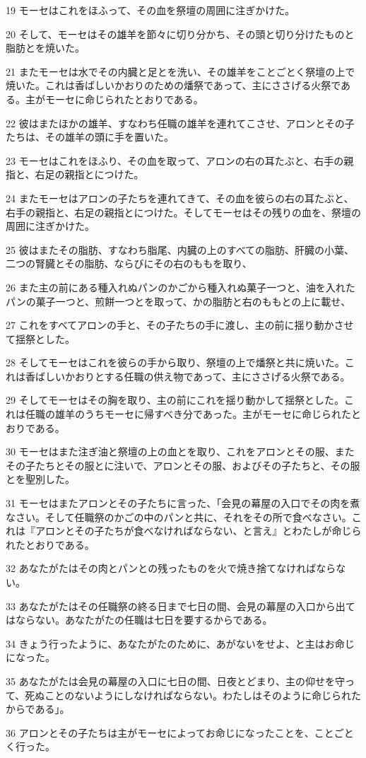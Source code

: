 \par 19 モーセはこれをほふって、その血を祭壇の周囲に注ぎかけた。
\par 20 そして、モーセはその雄羊を節々に切り分かち、その頭と切り分けたものと脂肪とを焼いた。
\par 21 またモーセは水でその内臓と足とを洗い、その雄羊をことごとく祭壇の上で焼いた。これは香ばしいかおりのための燔祭であって、主にささげる火祭である。主がモーセに命じられたとおりである。
\par 22 彼はまたほかの雄羊、すなわち任職の雄羊を連れてこさせ、アロンとその子たちは、その雄羊の頭に手を置いた。
\par 23 モーセはこれをほふり、その血を取って、アロンの右の耳たぶと、右手の親指と、右足の親指とにつけた。
\par 24 またモーセはアロンの子たちを連れてきて、その血を彼らの右の耳たぶと、右手の親指と、右足の親指とにつけた。そしてモーセはその残りの血を、祭壇の周囲に注ぎかけた。
\par 25 彼はまたその脂肪、すなわち脂尾、内臓の上のすべての脂肪、肝臓の小葉、二つの腎臓とその脂肪、ならびにその右のももを取り、
\par 26 また主の前にある種入れぬパンのかごから種入れぬ菓子一つと、油を入れたパンの菓子一つと、煎餅一つとを取って、かの脂肪と右のももとの上に載せ、
\par 27 これをすべてアロンの手と、その子たちの手に渡し、主の前に揺り動かさせて揺祭とした。
\par 28 そしてモーセはこれを彼らの手から取り、祭壇の上で燔祭と共に焼いた。これは香ばしいかおりとする任職の供え物であって、主にささげる火祭である。
\par 29 そしてモーセはその胸を取り、主の前にこれを揺り動かして揺祭とした。これは任職の雄羊のうちモーセに帰すべき分であった。主がモーセに命じられたとおりである。
\par 30 モーセはまた注ぎ油と祭壇の上の血とを取り、これをアロンとその服、またその子たちとその服とに注いで、アロンとその服、およびその子たちと、その服とを聖別した。
\par 31 モーセはまたアロンとその子たちに言った、「会見の幕屋の入口でその肉を煮なさい。そして任職祭のかごの中のパンと共に、それをその所で食べなさい。これは『アロンとその子たちが食べなければならない、と言え』とわたしが命じられたとおりである。
\par 32 あなたがたはその肉とパンとの残ったものを火で焼き捨てなければならない。
\par 33 あなたがたはその任職祭の終る日まで七日の間、会見の幕屋の入口から出てはならない。あなたがたの任職は七日を要するからである。
\par 34 きょう行ったように、あなたがたのために、あがないをせよ、と主はお命じになった。
\par 35 あなたがたは会見の幕屋の入口に七日の間、日夜とどまり、主の仰せを守って、死ぬことのないようにしなければならない。わたしはそのように命じられたからである」。
\par 36 アロンとその子たちは主がモーセによってお命じになったことを、ことごとく行った。

